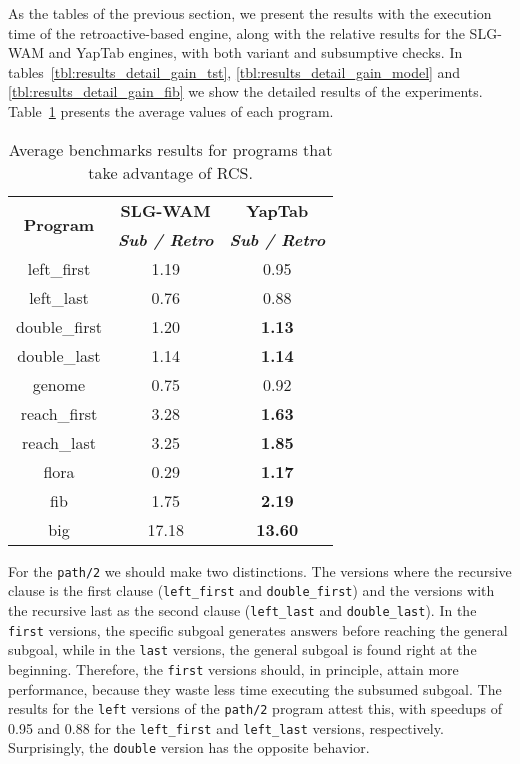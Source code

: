 As the tables of the previous section, we present the results with the execution time of the retroactive-based
engine, along with the relative results for the SLG-WAM and YapTab engines, with both variant and subsumptive checks.
In tables~\ref{tbl:results_detail_gain_tst}, \ref{tbl:results_detail_gain_model} and \ref{tbl:results_detail_gain_fib}
we show the detailed results of the experiments. Table~\ref{tbl:results_gain_overview} presents the average values of
each program.

\begin{table}[ht]
\centering
  \begin{tabular}{ccc}
   \hline
    \hline
    \multirow{2}{*}{\textbf{Program}} & \textbf{SLG-WAM} & \textbf{YapTab} \\
    & \textbf{\textit{\small{Sub / Retro}}} & \textbf{\textit{\small{Sub / Retro}}} \\
   \hline
   \hline
left\_first & 1.19 & 0.95 \\
left\_last & 0.76  & 0.88 \\
double\_first & 1.20 & \textbf{1.13} \\
double\_last & 1.14 & \textbf{1.14} \\
genome & 0.75 & 0.92 \\
reach\_first  & 3.28 & \textbf{1.63} \\
reach\_last  & 3.25 & \textbf{1.85} \\
flora & 0.29 & \textbf{1.17} \\
fib & 1.75 & \textbf{2.19} \\
big & 17.18 & \textbf{13.60} \\
\hline
\hline
\end{tabular}
\caption{Average benchmarks results for programs that take advantage of RCS.}
\label{tbl:results_gain_overview}
\end{table}

For the \texttt{path/2} we should make two distinctions. The versions where the recursive clause is the first
clause (\texttt{left\_first} and \texttt{double\_first}) and the versions with the recursive last as the second
clause (\texttt{left\_last} and \texttt{double\_last}). In the \texttt{first} versions, the specific subgoal
generates answers before reaching the general subgoal, while in the \texttt{last} versions, the general subgoal
is found right at the beginning. Therefore, the \texttt{first} versions should, in principle, attain more performance,
because they waste less time executing the subsumed subgoal. The results for the \texttt{left} versions of the
\texttt{path/2} program attest this, with speedups of 0.95 and 0.88 for the \texttt{left\_first} and
\texttt{left\_last} versions, respectively. Surprisingly, the \texttt{double} version has the opposite behavior.

